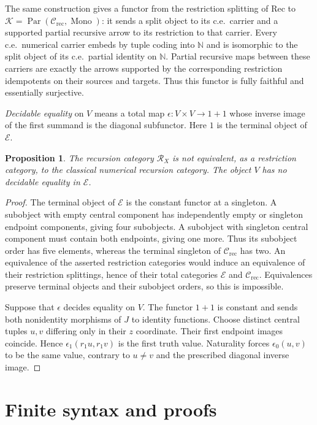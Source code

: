 \documentclass[11pt]{article}
\newtheorem{proposition}[theorem]{Proposition}
\newcommand{\N}{\mathbb N}
\begin{document}
The same construction gives a functor from the restriction splitting
of $\mathrm{Rec}$ to
$\mathcal K=\operatorname{Par}(\mathcal C_{\mathrm{rec}},
\operatorname{Mono})$: it sends a split object to its c.e.\ carrier
and a supported partial recursive arrow to its restriction to that
carrier. Every c.e.\
numerical carrier embeds by tuple coding into $\N$ and is
isomorphic to the split object of its c.e.\ partial identity
on $\N$. Partial recursive maps between these carriers are
exactly the arrows supported by the corresponding restriction
idempotents on their sources and targets. Thus this functor is fully
faithful and essentially surjective.

\emph{Decidable equality} on $V$ means a total map
$\epsilon:V\times V\to1+1$ whose inverse image of the first
summand is the diagonal subfunctor. Here $1$ is the terminal object of $\mathcal E$.

\begin{proposition}\label{prop:fork-distinction}
The recursion category $\mathscr R_X$ is not equivalent, as a
restriction category, to the classical numerical recursion category.
The object $V$ has no decidable equality in $\mathcal E$.
\end{proposition}
\begin{proof}
The terminal object of $\mathcal E$ is the constant functor at a singleton. A subobject
with empty central component has independently empty or singleton
endpoint components, giving four subobjects. A subobject with
singleton central component must contain both endpoints, giving
one more. Thus its subobject order has five elements, whereas
the terminal singleton of $\mathcal C_{\mathrm{rec}}$ has two.
An equivalence of the asserted restriction categories would induce
an equivalence of their restriction splittings, hence of their
total categories $\mathcal E$ and $\mathcal C_{\mathrm{rec}}$.
Equivalences preserve terminal objects and their subobject orders,
so this is impossible.

Suppose that $\epsilon$ decides equality on $V$. The functor $1+1$
is constant and sends both nonidentity morphisms of $J$ to
identity functions. Choose distinct central
tuples $u,v$ differing only in their $z$ coordinate. Their first
endpoint images coincide. Hence $\epsilon_1(r_1u,r_1v)$ is the
first truth value. Naturality forces $\epsilon_0(u,v)$ to be
the same value, contrary to $u\ne v$ and the prescribed diagonal
inverse image.
\end{proof}

\section{Finite syntax and proofs}
\label{app:fork-proofs}
\end{document}
